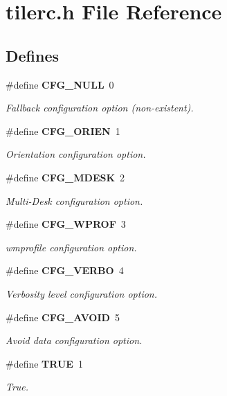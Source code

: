 \section{tilerc.h File Reference}
\label{tilerc_8h}
\subsection*{Defines}
\begin{CompactItemize}
\item 
\#define {\bf CFG\_\-NULL}~0
\begin{CompactList}\small\item\em Fallback configuration option (non-existent). \item\end{CompactList}\item 
\#define {\bf CFG\_\-ORIEN}~1
\begin{CompactList}\small\item\em Orientation configuration option. \item\end{CompactList}\item 
\#define {\bf CFG\_\-MDESK}~2
\begin{CompactList}\small\item\em Multi-Desk configuration option. \item\end{CompactList}\item 
\#define {\bf CFG\_\-WPROF}~3
\begin{CompactList}\small\item\em wmprofile configuration option. \item\end{CompactList}\item 
\#define {\bf CFG\_\-VERBO}~4
\begin{CompactList}\small\item\em Verbosity level configuration option. \item\end{CompactList}\item 
\#define {\bf CFG\_\-AVOID}~5
\begin{CompactList}\small\item\em Avoid data configuration option. \item\end{CompactList}\item 
\#define {\bf TRUE}~1
\begin{CompactList}\small\item\em True. \item\end{CompactList}\item 

\end{CompactItemize}
